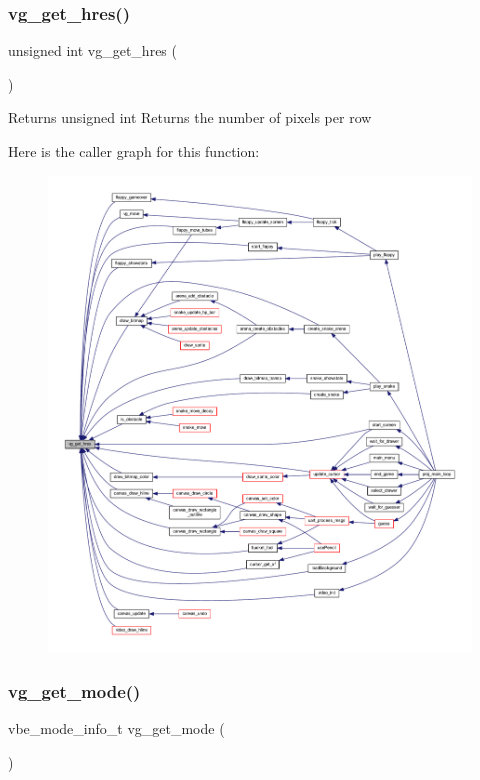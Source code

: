 \subsubsection{\texorpdfstring{vg\+\_\+get\+\_\+hres()}{vg\_get\_hres()}}
{\footnotesize\ttfamily unsigned int vg\+\_\+get\+\_\+hres (\begin{DoxyParamCaption}{ }\end{DoxyParamCaption})}

\begin{DoxyReturn}{Returns}
unsigned int Returns the number of pixels per row 
\end{DoxyReturn}
Here is the caller graph for this function\+:\nopagebreak
\begin{figure}[H]
\begin{center}
\leavevmode
\includegraphics[width=350pt]{group__video_gaa4a211ebfc5c87a0072eaf9bd03e3a56_icgraph}
\end{center}
\end{figure}
\mbox{\label{group__video_ga01a3ec260077196f30943673a3d4b451}} 
\subsubsection{\texorpdfstring{vg\+\_\+get\+\_\+mode()}{vg\_get\_mode()}}
{\footnotesize\ttfamily vbe\+\_\+mode\+\_\+info\+\_\+t vg\+\_\+get\+\_\+mode (\begin{DoxyParamCaption}{ }\end{DoxyParamCaption})}



